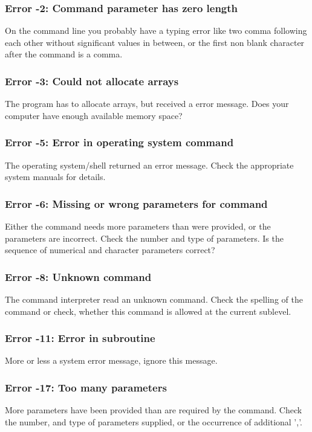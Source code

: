 \subsubsection{Error -2: Command parameter has zero length}
\par
On the command line you probably have a typing error like two 
comma following each other without significant values in between, 
or the first non blank character after the command is a comma. 
\subsubsection{Error -3: Could not allocate arrays}
\par
The program has to allocate arrays, but received a error message. 
Does your computer have enough available memory space? 
\subsubsection{Error -5: Error in operating system command}
\par
The operating system/shell returned an error message. Check the 
appropriate system manuals for details. 
\subsubsection{Error -6: Missing or wrong parameters for command}
\par
Either the command needs more parameters than were provided, or the 
parameters are incorrect. Check the number and type of parameters. Is 
the sequence of numerical and character parameters correct? 
\subsubsection{Error -8: Unknown command}
\par
The command interpreter read an unknown command. Check the spelling 
of the command or check, whether this command is allowed at the current 
sublevel. 
\subsubsection{Error -11: Error in subroutine}
\par
More or less a system error message, ignore this message. 
\subsubsection{Error -17: Too many parameters}
\par
More parameters have been provided than are required by the command. 
Check the number, and type of parameters supplied, or the occurrence 
of additional ','. 
